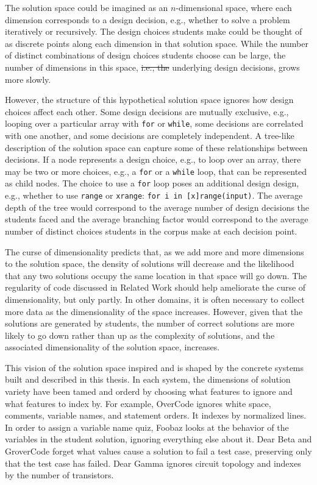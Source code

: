 \documentclass[12pt,twoside]{mitthesis}
\providecommand{\DIFaddtex}[1]{{\protect\color{blue}\uwave{#1}}} %
\providecommand{\DIFdeltex}[1]{{\protect\color{red}\sout{#1}}}                      %
\providecommand{\DIFaddbegin}{} %
\providecommand{\DIFaddend}{} %
\providecommand{\DIFdelbegin}{} %
\providecommand{\DIFdelend}{} %
\providecommand{\DIFadd}[1]{\texorpdfstring{\DIFaddtex{#1}}{#1}} %
\providecommand{\DIFdel}[1]{\texorpdfstring{\DIFdeltex{#1}}{}} %
\begin{document}
The solution space could be imagined as an $n$-dimensional space, where each dimension corresponds to a design decision, e.g., whether to solve a problem iteratively or recursively. The design choices students make could be thought of as discrete points along each dimension in that solution space. While the number of distinct combinations of design choices students choose can be large, the number of dimensions in this space, \DIFdelbegin \DIFdel{i.e., the }\DIFdelend \DIFaddbegin \DIFadd{which represent }\DIFaddend underlying design decisions, grows more slowly. 

However, the structure of this hypothetical solution space ignores how design choices affect each other. Some design decisions are mutually exclusive, e.g., looping over a particular array with \texttt{for} or \texttt{while}, some decisions are correlated with one another, and some decisions are completely independent. A tree-like description of the solution space can capture some of these relationships between decisions. If a node represents a design choice, e.g., to loop over an array, there may be two or more choices, e.g., a \texttt{for} or a \texttt{while} loop, that can be represented as child nodes. The choice to use a \texttt{for} loop poses an additional design design, e.g., whether to use \texttt{range} or \texttt{xrange}: \texttt{for i in [x]range(input)}. The average depth of the tree would correspond to the average number of design decisions the students faced and the average branching factor would correspond to the average number of distinct choices students in the corpus make at each decision point.

The curse of dimensionality predicts that, as we add more and more dimensions to the solution space, the density of solutions will decrease and the likelihood that any two solutions occupy the same location in that space will go down. The regularity of code discussed in Related Work should help ameliorate the curse of dimensionality, but only partly. In other domains, it is often necessary to collect more data as the dimensionality of the space increases. However, given that the solutions are generated by students, the number of correct solutions are more likely to go down rather than up as the complexity of solutions, and the associated dimensionality of the solution space, increases.

This vision of the solution space inspired and is shaped by the concrete systems built and described in this thesis. In each system, the dimensions of solution variety have been tamed and orderd by choosing what features to ignore and what features to index by. For example, OverCode ignores white space, comments, variable names, and statement orders. It indexes by normalized lines. In order to assign a variable name quiz, Foobaz looks at the behavior of the variables in the student solution, ignoring everything else about it. Dear Beta and GroverCode forget what values cause a solution to fail a test case, preserving only that the test case has failed. Dear Gamma ignores circuit topology and indexes by the number of transistors.
\end{document}
